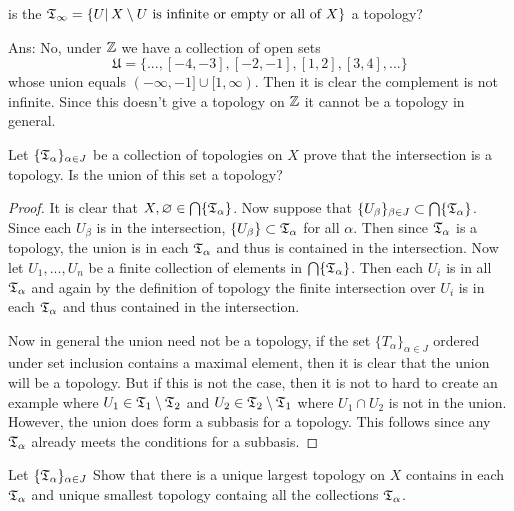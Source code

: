 


\maketitle


\question 
is the $\mathfrak{T}_\infty = \{U |\, X \setminus U \text{ is infinite or empty or all of } X\}$ a topology?

Ans: No, under $\mathbb{Z}$ we have a collection of open sets 
\[ \mathfrak{U} = \{ ... , [-4, -3], [-2, -1], [1, 2], [3, 4], ... \}\] 
whose union equals $(-\infty, -1] \cup [1, \infty)$. Then it is clear the complement is not infinite. Since this doesn't give a topology on $\mathbb{Z}$ it cannot 
be a topology in general. 

\question 

\begin{alphaparts}
\questionpart
Let $\{\mathfrak{T}_\alpha\}_{\alpha \in J}$ be a collection of topologies on $X$ prove that the intersection is a topology. Is the union of this set a topology? 


\begin{proof}
    It is clear that $X, \varnothing \in \bigcap \{\mathfrak{T}_\alpha\}$. Now suppose that $\{U_\beta\}_{\beta \in J} \subset \bigcap \{\mathfrak{T}_\alpha\}$. 
    Since each $U_\beta$ is in the intersection, $\{U_\beta\} \subset \mathfrak{T}_\alpha$ for all $\alpha$. Then since $\mathfrak{T}_\alpha$ is a topology, 
    the union is in each $\mathfrak{T}_\alpha$ and thus is contained in the intersection. Now let $U_1, ..., U_n$ be a finite collection of elements in 
    $\bigcap \{\mathfrak{T}_\alpha\}$. Then each $U_i$ is in all $\mathfrak{T}_\alpha$ and again by the definition of topology the finite intersection over $U_i$ is in each 
    $\mathfrak{T}_\alpha$ and thus contained in the intersection. 

    Now in general the union need not be a topology, if the set $\{T_\alpha\}_{\alpha \in J}$ ordered under set inclusion contains a maximal element, then it is clear that the union will be a topology. 
    But if this is not the case, then it is not to hard to create an example where $U_1 \in \mathfrak{T}_1 \setminus \mathfrak{T}_2$ and $U_2 \in \mathfrak{T}_2 \setminus \mathfrak{T}_1$ where $U_1 \cap U_2$ is not in the union. However, 
    the union does form a subbasis for a topology. This follows since any $\mathfrak{T}_\alpha$ already meets the conditions for a subbasis.
    
\end{proof}

\questionpart 
Let $\{\mathfrak{T}_\alpha\}_{\alpha \in J} $ Show that there is a unique largest topology on $X$ contains in each $\mathfrak{T}_\alpha$ and unique smallest topology containg all the collections $\mathfrak{T}_\alpha$. 


\end{alphaparts}
